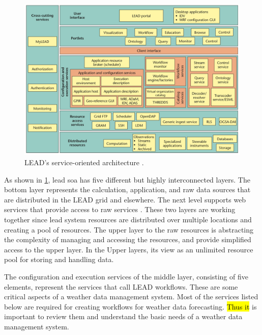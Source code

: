\begin{figure}[htp]
    \centering
    \includegraphics[width=1\textwidth]{lit/lead/LEADs-service-oriented-architecture-A-wide-variety-of-services-and-resources-grouped_W640.png}
    \caption[LEAD's service-oriented architecture]{LEAD's service-oriented architecture \cite{Droegemeier2005Service-OrientedWeather}.}
    \label{fi:lead_soa}
\end{figure}


As shown in \cref{fi:lead_soa}, \acrshort{lead} \acrshort{soa} has five different but highly interconnected layers. The bottom layer represents the calculation, application, and raw data sources that are distributed in the LEAD grid and elsewhere. The next level supports web services that provide access to raw services \cite{Droegemeier2005Service-OrientedWeather}. These two layers are working together since \acrshort{lead} system resources are distributed over multiple locations and creating a pool of resources. The upper layer to the raw resources is abstracting the complexity of managing and accessing the resources, and provide simplified access to the upper layer. In the Upper layers, its view as an unlimited resource pool for storing and handling data.

The configuration and execution services of the middle layer, consisting of five elements, represent the services that call LEAD workflows. These are some critical aspects of a weather data management system. Most of the services listed below are required for creating workflows for weather data forecasting. \hl{Thus it} is important to review them and understand the basic needs of a weather data management system.

